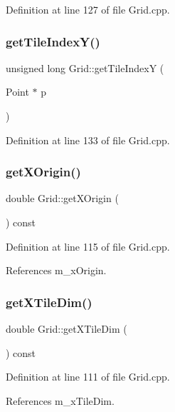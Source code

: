 Definition at line 127 of file Grid.\+cpp.

\mbox{\label{class_grid_adf39c1131c0ca762d284b6a5bf2bb29a}} 
\subsubsection{getTileIndexY()}
{\footnotesize\ttfamily unsigned long Grid\+::get\+Tile\+IndexY (\begin{DoxyParamCaption}\item[{Point $\ast$}]{p }\end{DoxyParamCaption})}



Definition at line 133 of file Grid.\+cpp.

\mbox{\label{class_grid_a08b534c7f8e1099a6903bf08d9727842}} 
\subsubsection{getXOrigin()}
{\footnotesize\ttfamily double Grid\+::get\+X\+Origin (\begin{DoxyParamCaption}{ }\end{DoxyParamCaption}) const}



Definition at line 115 of file Grid.\+cpp.



References m\+\_\+x\+Origin.

\mbox{\label{class_grid_a1c5b9ad91fac264bcdd67f99bc93f663}} 
\subsubsection{getXTileDim()}
{\footnotesize\ttfamily double Grid\+::get\+X\+Tile\+Dim (\begin{DoxyParamCaption}{ }\end{DoxyParamCaption}) const}



Definition at line 111 of file Grid.\+cpp.



References m\+\_\+x\+Tile\+Dim.

\mbox{\label{class_grid_a53141770920cf261579cf164a8909af9}} 
